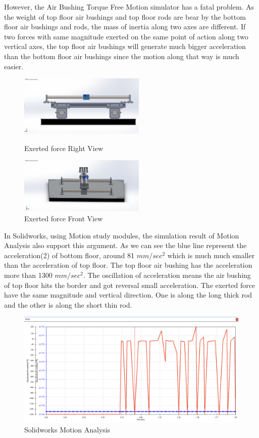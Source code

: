 However, the Air Bushing Torque Free Motion simulator has a fatal problem. As the weight of top floor air bushings and top floor rods are bear by the bottom floor air bushings and rods, the mass of inertia along two axes are different. If two forces with same magnitude exerted on the same point of action along two vertical axes, the top floor air bushings will generate much bigger acceleration than the bottom floor air bushings since the motion along that way is much easier.


\begin{figure}[H]\label{DOE-force}
\centering
\begin{minipage}[t]{0.48\textwidth}
\centering
\includegraphics[width = 6cm]{fig/DOE/Rightforce}
\caption{Exerted force Right View}
\end{minipage}
\begin{minipage}[t]{0.48\textwidth}
\centering
\includegraphics[width = 6cm]{fig/DOE/ForwardForce}
\caption{Exerted force Front View}
\end{minipage}
\end{figure}


In Solidworks, using Motion study modules, the simulation result of Motion Analysis also support this argument. As we can see the blue line represent the acceleration(2) of bottom floor, around 81 $mm/sec^2$ which is much much smaller than the acceleration of top floor. The top floor air bushing has the acceleration more than 1300 $mm/sec^2$. The oscillation of acceleration means the air bushing of top floor hits the border and got reversal small acceleration. The exerted force have the same magnitude and vertical direction. One is along the long thick rod and the other is along the short thin rod.


\begin{figure}[H]
\centering
\includegraphics[width=\linewidth]{fig/DOE/MotionAnalysis}
\caption{Solidworks Motion Analysis} 
\end{figure} 

